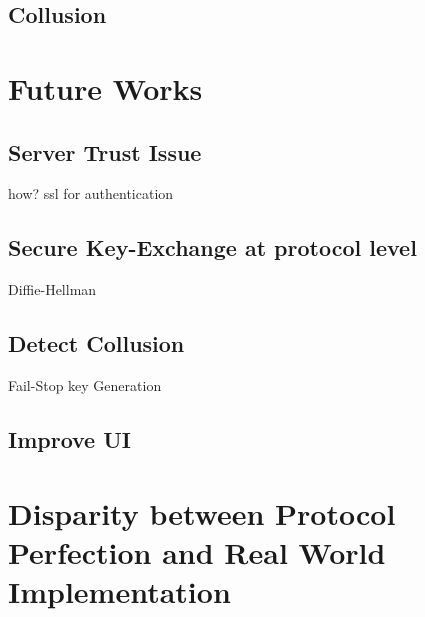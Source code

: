 \subsection{Collusion}


\section{Future Works}

\subsection{Server Trust Issue}
how? ssl for authentication

\subsection{Secure Key-Exchange at protocol level}
Diffie-Hellman

\subsection{Detect Collusion}
Fail-Stop key Generation

\subsection{Improve UI}


\section{Disparity between Protocol Perfection and Real World Implementation}



